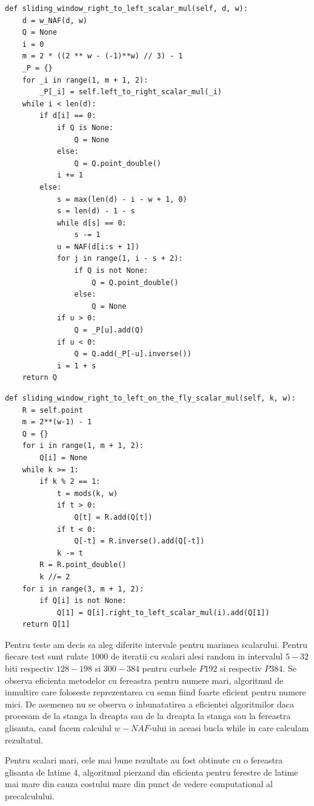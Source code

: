 \begin{lstlisting}
def sliding_window_right_to_left_scalar_mul(self, d, w):
    d = w_NAF(d, w)
    Q = None
    i = 0
    m = 2 * ((2 ** w - (-1)**w) // 3) - 1
    _P = {}
    for _i in range(1, m + 1, 2):
        _P[_i] = self.left_to_right_scalar_mul(_i)
    while i < len(d):
        if d[i] == 0:
            if Q is None:
                Q = None
            else:
                Q = Q.point_double()
            i += 1
        else:
            s = max(len(d) - i - w + 1, 0)
            s = len(d) - 1 - s
            while d[s] == 0:
                s -= 1
            u = NAF(d[i:s + 1])
            for j in range(1, i - s + 2):
                if Q is not None:
                    Q = Q.point_double()
                else:
                    Q = None
            if u > 0:
                Q = _P[u].add(Q)
            if u < 0:
                Q = Q.add(_P[-u].inverse())
            i = 1 + s
    return Q
\end{lstlisting}

\begin{lstlisting}
def sliding_window_right_to_left_on_the_fly_scalar_mul(self, k, w):
    R = self.point
    m = 2**(w-1) - 1
    Q = {}
    for i in range(1, m + 1, 2):
        Q[i] = None
    while k >= 1:
        if k % 2 == 1:
            t = mods(k, w)
            if t > 0:
                Q[t] = R.add(Q[t])
            if t < 0:
                Q[-t] = R.inverse().add(Q[-t])
            k -= t
        R = R.point_double()
        k //= 2
    for i in range(3, m + 1, 2):
        if Q[i] is not None:
            Q[1] = Q[i].right_to_left_scalar_mul(i).add(Q[1])
    return Q[1]
\end{lstlisting}

Pentru teste am decis sa aleg diferite intervale pentru marimea scalarului. Pentru fiecare test sunt rulate 1000 de iteratii cu scalari alesi random in intervalul $5-32$ biti respectiv $128-198$ si $300-384$ pentru curbele $P192$ si respectiv $P384$. Se observa eficienta metodelor cu fereastra pentru numere mari, algoritmul de inmultire care foloseste reprezentarea cu semn fiind foarte eficient pentru numere mici. De asemenea nu se observa o inbunatatirea a eficientei algoritmilor daca procesam de la stanga la dreapta sau de la dreapta la stanga sau la fereastra glisanta, cand facem calculul $w-NAF$-ului in aceasi bucla while in care calculam rezultatul.

Pentru scalari mari, cele mai bune rezultate au fost obtinute cu o fereastra glisanta de latime 4, algoritmul pierzand din eficienta pentru ferestre de latime mai mare din cauza costului mare din punct de vedere computational al precalculului. 

